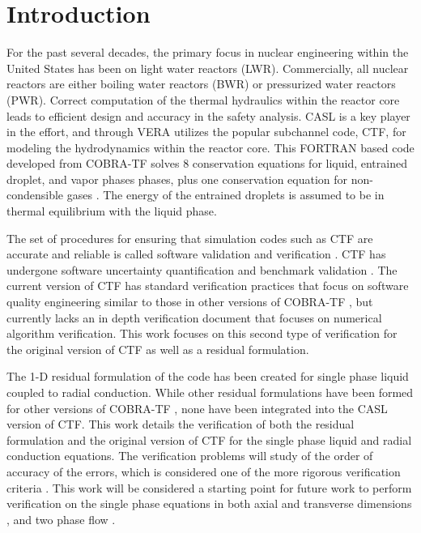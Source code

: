 
\vspace*{-80mm}
\chapter{Introduction} \label{chapter1:introduction}
\setlength{\textheight}{8.5in}
\mainmatter

For the past several decades, the primary focus in nuclear engineering within
the United States has been on light water reactors (LWR). Commercially,
all nuclear reactors are either boiling water reactors (BWR) or pressurized
water reactors (PWR). Correct computation of the thermal hydraulics within the
reactor core leads to efficient design and accuracy in the safety analysis. 
CASL is a key player in the effort, and through VERA \cite{Schmidt2014} utilizes
the popular subchannel code, CTF, for modeling the hydrodynamics within the reactor core.
This FORTRAN based code developed from COBRA-TF solves 8 conservation equations
for liquid, entrained droplet, and vapor phases phases, plus one conservation
equation for non-condensible gases \cite{CTF_theory}. The energy of the
entrained droplets is assumed to be in thermal equilibrium with the liquid
phase.

The set of procedures for ensuring that simulation codes such as CTF are
accurate and reliable is called software validation and verification
\cite{Oberkampf2008}. CTF has undergone software uncertainty quantification and
benchmark validation \cite{Avramova2015}. The current version of CTF has
standard verification practices that focus on software quality engineering
similar to those in other versions of COBRA-TF \cite{Aumiller2013}, but
currently lacks an in depth verification document that focuses on numerical
algorithm verification. This work focuses on this second type of verification
for the original version of CTF as well as a residual formulation. 

The 1-D residual formulation of the code has been created for single phase
liquid coupled to radial conduction. While other residual formulations have been
formed for other versions of COBRA-TF \cite{Lloyd2014}, none have been
integrated into the CASL version of CTF. This work details the verification of
both the residual formulation and the original version of CTF for the single
phase liquid and radial conduction equations. The verification problems will
study of the order of accuracy of the errors, which is considered one of the
more rigorous verification criteria \cite{Roy2005}. This work will be
considered a starting point for future work to perform verification on the
single phase equations in both axial and transverse dimensions
\cite{Merroun2009}, and two phase flow \cite{Mahadevan2009}.

